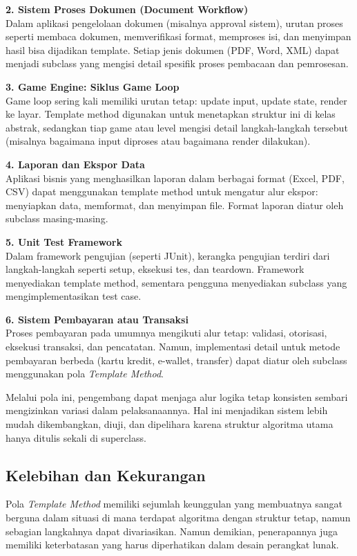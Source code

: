 \textbf{2. Sistem Proses Dokumen (Document Workflow)} \\
Dalam aplikasi pengelolaan dokumen (misalnya approval sistem), urutan proses seperti membaca dokumen, memverifikasi format, memproses isi, dan menyimpan hasil bisa dijadikan template. Setiap jenis dokumen (PDF, Word, XML) dapat menjadi subclass yang mengisi detail spesifik proses pembacaan dan pemrosesan.

\textbf{3. Game Engine: Siklus Game Loop} \\
Game loop sering kali memiliki urutan tetap: update input, update state, render ke layar. Template method digunakan untuk menetapkan struktur ini di kelas abstrak, sedangkan tiap game atau level mengisi detail langkah-langkah tersebut (misalnya bagaimana input diproses atau bagaimana render dilakukan).

\textbf{4. Laporan dan Ekspor Data} \\
Aplikasi bisnis yang menghasilkan laporan dalam berbagai format (Excel, PDF, CSV) dapat menggunakan template method untuk mengatur alur ekspor: menyiapkan data, memformat, dan menyimpan file. Format laporan diatur oleh subclass masing-masing.

\textbf{5. Unit Test Framework} \\
Dalam framework pengujian (seperti JUnit), kerangka pengujian terdiri dari langkah-langkah seperti setup, eksekusi tes, dan teardown. Framework menyediakan template method, sementara pengguna menyediakan subclass yang mengimplementasikan test case.

\textbf{6. Sistem Pembayaran atau Transaksi} \\
Proses pembayaran pada umumnya mengikuti alur tetap: validasi, otorisasi, eksekusi transaksi, dan pencatatan. Namun, implementasi detail untuk metode pembayaran berbeda (kartu kredit, e-wallet, transfer) dapat diatur oleh subclass menggunakan pola \textit{Template Method}.

Melalui pola ini, pengembang dapat menjaga alur logika tetap konsisten sembari mengizinkan variasi dalam pelaksanaannya. Hal ini menjadikan sistem lebih mudah dikembangkan, diuji, dan dipelihara karena struktur algoritma utama hanya ditulis sekali di superclass.

\subsection{Kelebihan dan Kekurangan}

Pola \textit{Template Method} memiliki sejumlah keunggulan yang membuatnya sangat berguna dalam situasi di mana terdapat algoritma dengan struktur tetap, namun sebagian langkahnya dapat divariasikan. Namun demikian, penerapannya juga memiliki keterbatasan yang harus diperhatikan dalam desain perangkat lunak.

